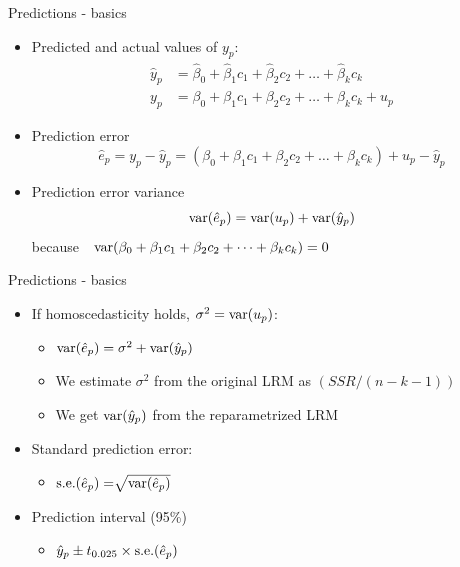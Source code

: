 \documentclass{beamer}
\begin{document}

\begin{frame}{Predictions - basics}
\begin{itemize}
\item Predicted and actual values of $y_p$:
\begin{align}\nonumber
\hat{y}_p &  = \hat{\beta}_0 + \hat{\beta}_1 c_1 + \hat{\beta}_2 c_2 + \dots + \hat{\beta}_k c_k\\ \nonumber
y_p & = \beta_0 + \beta_1 c_1 + \beta_2 c_2 + \dots+\beta_k c_k + u_p \nonumber
\end{align} 
\item Prediction error
$$\hat{e}_p = y_p - \hat{y}_p = (\beta_0 + \beta_1 c_1 + \beta_2 c_2 + \dots+\beta_k c_k) + u_p - \hat{y}_p$$
\item Prediction error variance
$$\textnormal{var}(\hat{e}_p) = \textnormal{var}(u_p) + \textnormal{var}(\hat{y}_p)$$
because~~$\textnormal{var}(\beta_0 + \beta_1 c_1 + \beta_2 c_2 + \dots+\beta_k c_k)=0$
\end{itemize}
\end{frame}


\begin{frame}{Predictions - basics}
\begin{itemize}
\item If homoscedasticity holds, $\sigma^2 = \textnormal{var}(u_p)$: \\

\begin{itemize}
\item $\textnormal{var}(\hat{e}_p) = \sigma^2 + \textnormal{var}(\hat{y}_p)$
\vspace{0.2cm}
\item We estimate $\sigma^2$ from the original LRM as $(\textit{SSR}/(n-k-1))$
\vspace{0.2cm}
\item We get $\textnormal{var}(\hat{y}_p)$ from the reparametrized LRM
\end{itemize}
\vspace{0.5cm}
\item Standard prediction error:
\begin{itemize}
\vspace{0.2cm}
 \item $\textnormal{s.e.}(\hat{e}_p) = \sqrt[]{\textnormal{var}(\hat{e}_p)}$
\end{itemize}
\vspace{0.5cm}
\item Prediction interval (95\%)
\vspace{0.2cm}
\begin{itemize}
\item $\hat{y}_p \pm t_{0.025} \times \textnormal{s.e.}(\hat{e}_p) $
\end{itemize}
\end{itemize}
\end{frame}
\end{document}
